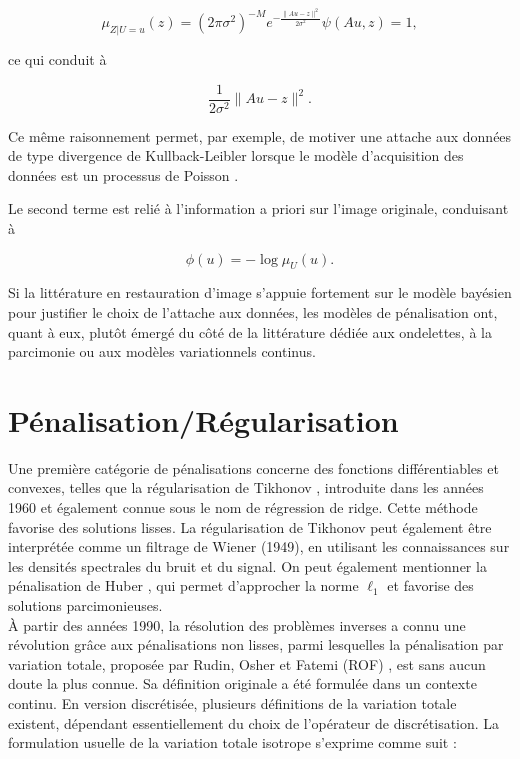 \documentclass[a4paper, 12pt]{article} %
\begin{document}
\begin{equation}
\mu_{Z|U=u}(z) = (2\pi\sigma^2)^{-M} e^{-\frac{\|Au - z\|^2}{2\sigma^2}} \psi(Au,z) = 1,
\end{equation}

ce qui conduit à 

\begin{equation}
\frac{1}{2\sigma^2} \|Au - z\|^2.
\end{equation}

Ce même raisonnement permet, par exemple, de motiver une attache aux données de type divergence de Kullback-Leibler lorsque le modèle d’acquisition des données est un processus de Poisson \cite{ref26}. 

Le second terme est relié à l’information a priori sur l’image originale, conduisant à 

\begin{equation}
\phi(u) = -\log \mu_U(u).
\end{equation}

Si la littérature en restauration d’image s’appuie fortement sur le modèle bayésien pour justifier le choix de l'attache aux données, les modèles de pénalisation ont, quant à eux, plutôt émergé du côté de la littérature dédiée aux ondelettes, à la parcimonie ou aux modèles variationnels continus.
\section{Pénalisation/Régularisation}
Une première catégorie de pénalisations concerne des fonctions différentiables et convexes, telles que la régularisation de Tikhonov \cite{28}, introduite dans les années 1960 et également connue sous le nom de régression de ridge. Cette méthode favorise des solutions lisses. La régularisation de Tikhonov peut également être interprétée comme un filtrage de Wiener (1949), en utilisant les connaissances sur les densités spectrales du bruit et du signal. On peut également mentionner la pénalisation de Huber \cite{20}, qui permet d'approcher la norme \(\ell_1\) et favorise des solutions parcimonieuses.\\
À partir des années 1990, la résolution des problèmes inverses a connu une révolution grâce aux pénalisations non lisses, parmi lesquelles la pénalisation par variation totale, proposée par Rudin, Osher et Fatemi (ROF) \cite{27}, est sans aucun doute la plus connue. Sa définition originale a été formulée dans un contexte continu. En version discrétisée, plusieurs définitions de la variation totale existent, dépendant essentiellement du choix de l’opérateur de discrétisation. La formulation usuelle de la variation totale isotrope s'exprime comme suit :
\end{document}
